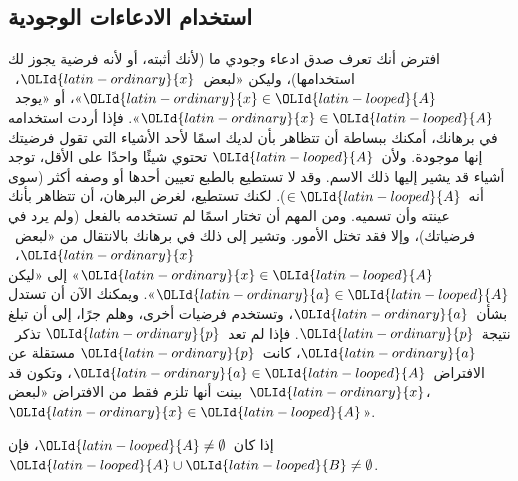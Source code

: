 \documentclass[../../../include/open-logic-section]{subfiles}
\begin{document}
\subsection{استخدام الادعاءات الوجودية}

افترض أنك تعرف صدق ادعاء وجودي ما (لأنك أثبته، أو لأنه فرضية يجوز لك
استخدامها)، وليكن «لبعض~$\OLId{latin-ordinary}{x}$،~$\OLId{latin-ordinary}{x} \in \OLId{latin-looped}{A}$»، أو «يوجد~$\OLId{latin-ordinary}{x} \in \OLId{latin-looped}{A}$». فإذا
أردت استخدامه في برهانك، أمكنك ببساطة أن تتظاهر بأن لديك اسمًا لأحد
الأشياء التي تقول فرضيتك إنها موجودة. ولأن~$\OLId{latin-looped}{A}$ تحتوي شيئًا واحدًا على
الأقل، توجد أشياء قد يشير إليها ذلك الاسم. وقد لا تستطيع بالطبع
تعيين أحدها أو وصفه أكثر (سوى أنه~$\in \OLId{latin-looped}{A}$). لكنك تستطيع، لغرض
البرهان، أن تتظاهر بأنك عينته وأن تسميه. ومن المهم أن تختار اسمًا لم
تستخدمه بالفعل (ولم يرد في فرضياتك)، وإلا فقد تختل الأمور. وتشير إلى
ذلك في برهانك بالانتقال من «لبعض~$\OLId{latin-ordinary}{x}$،~$\OLId{latin-ordinary}{x} \in \OLId{latin-looped}{A}$» إلى «ليكن
$\OLId{latin-ordinary}{a} \in \OLId{latin-looped}{A}$». ويمكنك الآن أن تستدل بشأن~$\OLId{latin-ordinary}{a}$، وتستخدم فرضيات أخرى، وهلم
جرًا، إلى أن تبلغ نتيجة~$\OLId{latin-ordinary}{p}$. فإذا لم تعد~$\OLId{latin-ordinary}{p}$ تذكر~$\OLId{latin-ordinary}{a}$، كانت~$\OLId{latin-ordinary}{p}$
مستقلة عن الافتراض~$\OLId{latin-ordinary}{a} \in \OLId{latin-looped}{A}$، وتكون قد بينت أنها تلزم فقط من الافتراض
«لبعض~$\OLId{latin-ordinary}{x}$،~$\OLId{latin-ordinary}{x} \in \OLId{latin-looped}{A}$».

\begin{prop}
إذا كان~$\OLId{latin-looped}{A} \neq \emptyset$، فإن~$\OLId{latin-looped}{A} \cup \OLId{latin-looped}{B} \neq \emptyset$.
\end{prop}
\end{document}

